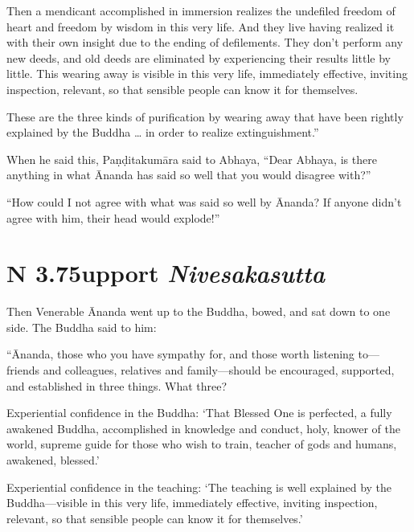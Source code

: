 \documentclass[12pt,openany]{book}%
\newcommand*{\suttatitleacronym}[1]{\smaller[2]{#1}\vspace*{.3em}}
\newcommand*{\suttatitletranslation}[1]{\linebreak{#1}}
\newcommand*{\suttatitleroot}[1]{\linebreak\smaller[2]\itshape{#1}}
\newcommand*{\tocacronym}[1]{\hspace*{-3.3em}{#1}\quad}
\newcommand*{\toctranslation}[1]{#1}
\newcommand*{\tocroot}[1]{(\textit{#1})}
\begin{document}
Then a mendicant accomplished in immersion realizes the undefiled freedom of heart and freedom by wisdom in this very life. And they live having realized it with their own insight due to the ending of defilements. They don’t perform any new deeds, and old deeds are eliminated by experiencing their results little by little. This wearing away is visible in this very life, immediately effective, inviting inspection, relevant, so that sensible people can know it for themselves. 

These are the three kinds of purification by wearing away that have been rightly explained by the Buddha … in order to realize extinguishment.” 

When he said this, \textsanskrit{Paṇḍitakumāra} said to Abhaya, “Dear Abhaya, is there anything in what Ānanda has said so well that you would disagree with?” 

“How could I not agree with what was said so well by Ānanda? If anyone didn’t agree with him, their head would explode!” 

%
\section*{{\suttatitleacronym AN 3.75}{\suttatitletranslation Support }{\suttatitleroot Nivesakasutta}}
\addcontentsline{toc}{section}{\tocacronym{AN 3.75} \toctranslation{Support } \tocroot{Nivesakasutta}}

Then Venerable Ānanda went up to the Buddha, bowed, and sat down to one side. The Buddha said to him: 

“Ānanda, those who you have sympathy for, and those worth listening to—friends and colleagues, relatives and family—should be encouraged, supported, and established in three things. What three? 

Experiential confidence in the Buddha: ‘That Blessed One is perfected, a fully awakened Buddha, accomplished in knowledge and conduct, holy, knower of the world, supreme guide for those who wish to train, teacher of gods and humans, awakened, blessed.’ 

Experiential confidence in the teaching: ‘The teaching is well explained by the Buddha—visible in this very life, immediately effective, inviting inspection, relevant, so that sensible people can know it for themselves.’ 
\end{document}
